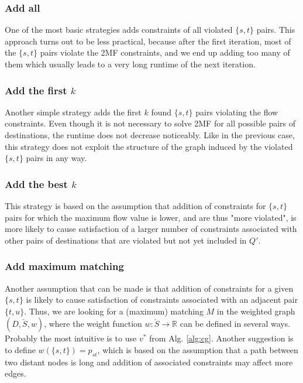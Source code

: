\subsubsection{Add all}

One of the most basic strategies adds constraints of all violated $\{s,t\}$ pairs.
This approach turns out to be less practical, because after the first iteration, most of the $\{s,t\}$ pairs violate the 2MF constraints, and we end up adding too many of them which usually leads to a very long runtime of the next iteration.

\subsubsection{Add the first $k$}

Another simple strategy adds the first $k$ found $\{s,t\}$ pairs violating the flow constraints.
Even though it is not necessary to solve 2MF for all possible pairs of destinations, the runtime does not decrease noticeably.
Like in the previous case, this strategy does not exploit the structure of the graph induced by the violated $\{s,t\}$ pairs in any way.

\subsubsection{Add the best $k$}

This strategy is based on the assumption that addition of constraints for $\{s,t\}$ pairs for which the maximum flow value is lower, and are thus "more violated", is more likely to cause satisfaction of a larger number of constraints associated with other pairs of destinations that are violated but not yet included in $Q'$.

\subsubsection{Add maximum matching}

Another assumption that can be made is that addition of constraints for a given $\{s,t\}$ is likely to cause satisfaction of constraints associated with an adjacent pair $\{t,u\}$.
Thus, we are looking for a (maximum) matching $M$ in the weighted graph $(D,\check{S},w)$, where the weight function $w:\check{S}\to\mathbb{R}$ can be defined in several ways.
Probably the most intuitive is to use $v^*$ from Alg. \ref{alg:cg}.
Another suggestion is to define $w(\{s,t\})=p_{st}$, which is based on the assumption that a path between two distant nodes is long and addition of associated constraints may affect more edges.

%
%
%

